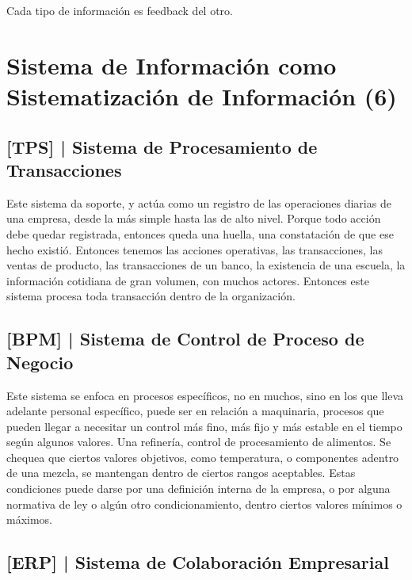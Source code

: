 Cada tipo de información es feedback del otro.

\hypertarget{sistema-de-informaciuxf3n-como-sistematizaciuxf3n-de-informaciuxf3n-6}{%
\section{Sistema de Información como Sistematización de Información
(6)}\label{sistema-de-informaciuxf3n-como-sistematizaciuxf3n-de-informaciuxf3n-6}}

\hypertarget{sistema-de-procesamiento-de-transacciones-tps}{%
\subsection{%
{[}TPS{]} |
Sistema de Procesamiento de Transacciones
}\label{sistema-de-procesamiento-de-transacciones-tps}}

Este sistema da soporte, y actúa como un registro de las operaciones
diarias de una empresa, desde la más simple hasta las de alto nivel.
Porque todo acción debe quedar registrada, entonces queda una huella,
una constatación de que ese hecho existió. Entonces tenemos las acciones
operativas, las transacciones, las ventas de producto, las transacciones
de un banco, la existencia de una escuela, la información cotidiana de
gran volumen, con muchos actores. Entonces este sistema procesa toda
transacción dentro de la organización.

\hypertarget{sistema-de-control-de-proceso-de-negocio-bpm}{%
\subsection{%
{[}BPM{]} |
Sistema de Control de Proceso de Negocio
}\label{sistema-de-control-de-proceso-de-negocio-bpm}}

Este sistema se enfoca en procesos específicos, no en muchos, sino en
los que lleva adelante personal específico, puede ser en relación a
maquinaria, procesos que pueden llegar a necesitar un control más fino,
más fijo y más estable en el tiempo según algunos valores. Una
refinería, control de procesamiento de alimentos. Se chequea que ciertos
valores objetivos, como temperatura, o componentes adentro de una
mezcla, se mantengan dentro de ciertos rangos aceptables. Estas
condiciones puede darse por una definición interna de la empresa, o por
alguna normativa de ley o algún otro condicionamiento, dentro ciertos
valores mínimos o máximos.

\hypertarget{sistema-de-colaboraciuxf3n-empresarial-erp}{%
\subsection{%
{[}ERP{]} |
Sistema de Colaboración Empresarial
}\label{sistema-de-colaboraciuxf3n-empresarial-erp}}

